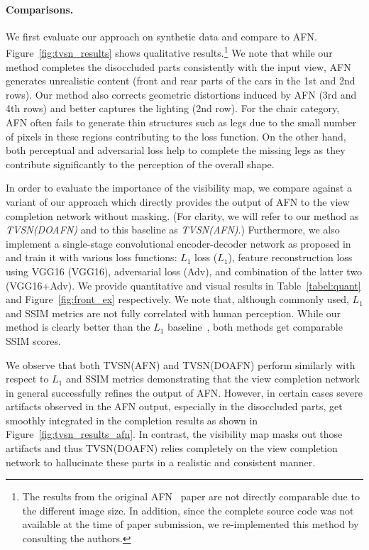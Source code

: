 \documentclass[10pt,twocolumn,letterpaper]{article}
\begin{document}
\vspace{-2mm}
\paragraph{Comparisons.} We first evaluate our approach on synthetic data and compare to AFN. Figure~\ref{fig:tvsn_results} shows qualitative results.\footnote{The results from the original AFN~\cite{Zhou_eccv2016} paper are not directly comparable due to the different image size. In addition, since the complete source code was not available at the time of paper submission, we re-implemented this method by consulting the authors.}
We note that while our method completes the disoccluded parts consistently with the input view, AFN generates unrealistic content (front and rear parts of the cars in the 1st and 2nd rows). Our method also corrects geometric distortions induced by AFN (3rd and 4th rows) and better captures the lighting (2nd row). For the chair category, AFN often fails to generate thin structures such as legs due to the small number of pixels in these regions contributing to the loss function. On the other hand, both perceptual and adversarial loss help to complete the missing legs as they contribute significantly to the perception of the overall shape.

\vspace{2mm}
In order to evaluate the importance of the visibility map, we compare against a variant of our approach which directly provides the output of AFN to the view completion network without masking. (For clarity, we will refer to our method as \emph{TVSN(DOAFN)} and to this baseline as \emph{TVSN(AFN)}.) Furthermore, we also implement a single-stage convolutional encoder-decoder network as proposed in~\cite{tatarchenko_eccv2016} and train it with various loss functions: $L_1$ loss ($L_1$), feature reconstruction loss using VGG16 (VGG16), adversarial loss (Adv), and combination of the latter two (VGG16+Adv).
We provide quantitative and visual results in Table~\ref{tabel:quant} and Figure~\ref{fig:front_ex} respectively. We note that, although commonly used, $L_1$ and SSIM metrics are not fully correlated with human perception. While our method is clearly better than the $L_1$ baseline~\cite{tatarchenko_eccv2016}, both methods get comparable SSIM scores. 

We observe that both TVSN(AFN) and TVSN(DOAFN) perform similarly with respect to $L_1$ and SSIM metrics demonstrating that the view completion network in general successfully refines the output of AFN. However, in certain cases severe artifacts observed in the AFN output, especially in the disoccluded parts, get smoothly integrated in the completion results as shown in Figure~\ref{fig:tvsn_results_afn}. In contrast, the visibility map masks out those artifacts and thus TVSN(DOAFN) relies completely on the view completion network to hallucinate these parts in a realistic and consistent manner.
\end{document}
